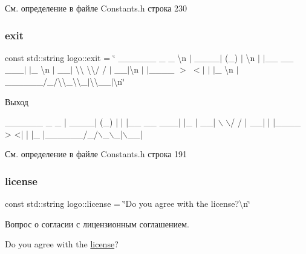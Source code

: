 См. определение в файле Constants.\+h строка 230

\mbox{\label{namespacelogo_aba8ca66bcf8abe6a0991a13887671863}} 
\subsubsection{\texorpdfstring{exit}{exit}}
{\footnotesize\ttfamily const std\+::string logo\+::exit = \char`\"{} \+\_\+\+\_\+\+\_\+\+\_\+\+\_\+\+\_\+ \+\_\+ \+\_\+ \textbackslash{}n $\vert$ \+\_\+\+\_\+\+\_\+\+\_\+$\vert$ (\+\_\+) $\vert$ \textbackslash{}n $\vert$ $\vert$\+\_\+\+\_\+ \+\_\+\+\_\+ \+\_\+\+\_\+\+\_\+$\vert$ $\vert$\+\_\+ \textbackslash{}n $\vert$ \+\_\+\+\_\+$\vert$ \textbackslash{}\textbackslash{} \textbackslash{}\textbackslash{}/ / $\vert$ \+\_\+\+\_\+$\vert$\textbackslash{}n $\vert$ $\vert$\+\_\+\+\_\+\+\_\+\+\_\+ $>$ $<$$\vert$ $\vert$ $\vert$\+\_\+ \textbackslash{}n $\vert$\+\_\+\+\_\+\+\_\+\+\_\+\+\_\+\+\_\+/\+\_\+/\textbackslash{}\textbackslash{}\+\_\+\textbackslash{}\textbackslash{}\+\_\+$\vert$\textbackslash{}\textbackslash{}\+\_\+\+\_\+$\vert$\textbackslash{}n\char`\"{}}

Выход 
\begin{DoxyCode}
 \_\_\_\_\_\_      \_ \_   
|  \_\_\_\_|    (\_) |  
| |\_\_  \_\_  \_\_\_| |\_ 
|  \_\_| \(\backslash\) \(\backslash\)/ / | \_\_|
| |\_\_\_\_ >  <| | |\_ 
|\_\_\_\_\_\_/\_/\(\backslash\)\_\(\backslash\)\_|\(\backslash\)\_\_|
\end{DoxyCode}
 

См. определение в файле Constants.\+h строка 191

\mbox{\label{namespacelogo_ae5491adc000fde7d3d8229372c877da2}} 
\subsubsection{\texorpdfstring{license}{license}}
{\footnotesize\ttfamily const std\+::string logo\+::license = \char`\"{}Do you agree with the license?\textbackslash{}n\char`\"{}}

Вопрос о согласии с лицензионным соглашением. 
\begin{DoxyCode}
Do you agree with the \hyperlink{namespacelogo_ae5491adc000fde7d3d8229372c877da2}{license}?
\end{DoxyCode}
 

